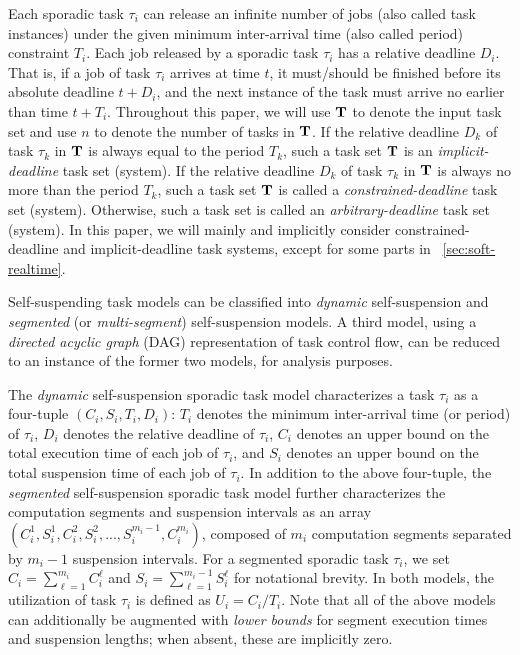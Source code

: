 \label{sec:model}


Each sporadic task $\tau_i$ can release an infinite number of jobs (also called task instances) under the given minimum inter-arrival time (also called period) constraint $T_i$.  Each job released by a sporadic task $\tau_i$ has a relative deadline $D_i$.  That is, if a job of task $\tau_i$ arrives at time $t$, it must/should be finished before its absolute deadline $t+D_i$, and the next instance of the task must arrive no earlier than time $t + T_i$.
Throughout this paper, we will use ${\bf T}$ to denote the input task
set and use $n$ to denote the number of tasks in ${\bf T}$. 
If the relative deadline $D_k$ of task $\tau_k$ in ${\bf T}$ is always
equal to the period $T_k$, such a task set ${\bf T}$ is an
\emph{implicit-deadline} task set (system). If the relative deadline $D_k$ of
task $\tau_k$ in ${\bf T}$ is always no more than the period $T_k$,
such a task set ${\bf T}$ is called a \emph{constrained-deadline} task
set (system). Otherwise, such a task set is called an \emph{arbitrary-deadline}
task set (system). In this paper, we will mainly and implicitly 
consider constrained-deadline and
implicit-deadline task systems, except for some parts in
\mysectionref{}~\ref{sec:soft-realtime}.
  
Self-suspending task models can be classified into \emph{dynamic} self-suspension and \emph{segmented} (or \emph{multi-segment})
self-suspension models. A third model, using a \emph{directed acyclic graph} (DAG) representation of task control flow, can be 
reduced to an instance of the former two models, for analysis purposes.

The \emph{dynamic} self-suspension sporadic task model characterizes a task $\tau_i$ as a four-tuple $(C_i,S_i,T_i,D_i)$: $T_i$ denotes the 
minimum inter-arrival time (or period) of $\tau_i$, $D_i$ denotes the relative deadline of $\tau_i$, $C_i$ denotes an upper bound on 
the total execution time of each job of $\tau_i$, and $S_i$ denotes an upper bound on the total suspension time of each job of $\tau_i$.  
In addition to the above four-tuple, the \emph{segmented} self-suspension sporadic task model further characterizes the computation segments and suspension 
intervals as an array $(C_{i}^1,S_{i}^1,C_{i}^2,S_{i}^2,...,S_{i}^{m_i-1},C_{i}^{m_i})$, composed of $m_i$ computation segments 
separated by $m_i-1$ suspension intervals.  For a segmented sporadic task $\tau_i$, we set 
$C_i = \sum_{\ell=1}^{m_i} C_i^\ell$ and $S_i=\sum_{\ell=1}^{m_i-1} S_i^\ell$ for notational brevity.
In both models, the
utilization of task $\tau_i$ is defined as $U_i=C_i/T_i$.
Note that all of the above models can additionally be augmented with \emph{lower bounds} for segment execution times and suspension 
lengths; when absent, these are implicitly zero.


